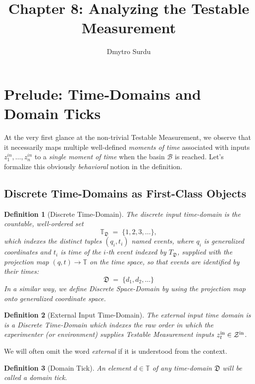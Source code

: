 \documentclass[12pt]{article}
\title{\textbf{Chapter 8: Analyzing the Testable Measurement}}
\author{Dmytro Surdu}
\newtheorem{definition}{Definition}[section]
\begin{document}
\maketitle

\section{Prelude: Time‑Domains and Domain Ticks}
\label{sec:prelude-time}
At the very first glance at the non-trivial Testable Measurement, we observe that it necessarily maps multiple well-defined \textit{moments of time} associated with inputs \({z^{in}_1,\dots,z^{in}_n}\) to a \textit{single moment of time} when the basin \(\mathcal{B}\) is reached. Let's formalize this obviously \textit{behavioral} notion in the definition.

\subsection*{Discrete Time-Domains as First-Class Objects}

\begin{definition}[Discrete Time-Domain]
The \emph{discrete input time-domain} is the countable, well-ordered set
    \[
  \mathbb{T}_\mathfrak{D} \;=\; \{1,2,3,\dots\},
\] which indexes the distinct tuples \((q_i,t_i)\) named events, where \(q_i\) is generalized coordinates and \(t_i\) is time of the \(i\)-th event indexed by \(T_\mathfrak{D}\), supplied with the projection map \((q,t)\longrightarrow \mathbb{T}\) on the time space, so that events are identified by their times:
\[
\mathfrak{D} \;=\; \{d_1,d_2,\dots\}
\]
In a similar way, we define Discrete Space-Domain by using the projection map onto generalized coordinate space.
\end{definition}

\begin{definition}[External Input Time-Domain]
    The \textit{external input} time domain is is a Discrete Time-Domain which indexes the raw order in which the experimenter (or environment) supplies Testable Measurement inputs \(z^{\rm in}_t \in \mathcal Z^{\rm in}\).
\end{definition}
We will often omit the word \textit{external} if it is understood from the context.


\begin{definition}[Domain Tick]
An element \(d\in\mathbb T\) of any time-domain \(\mathfrak {D}\) will be called a \emph{domain tick}.  
\end{definition}
\end{document}
